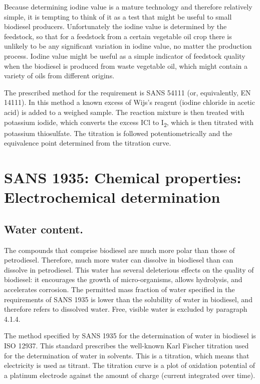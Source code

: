 Because determining iodine value is a mature technology and therefore relatively
simple, it is tempting to think of it as a test that might be useful to small
biodiesel producers. Unfortunately the iodine value is determined by the
feedstock, so that for a feedstock from a certain vegetable oil crop there is
unlikely to be any significant variation in iodine value, no matter the
production process. Iodine value might be useful as a simple indicator of
feedstock quality when the biodiesel is produced from waste vegetable oil, which
might contain a variety of oils from different origins.

The prescribed method for the requirement is SANS 54111 (or, equivalently, EN
14111). In this method a known excess of Wijs's reagent (iodine chloride in
acetic acid) is added to a weighed sample. The reaction mixture is then treated
with potassium iodide, which converts the excess ICl to I\textsubscript{2},
which is then titrated with potassium thiosulfate. The titration is followed
potentiometrically and the equivalence point determined from the titration
curve.

\section{SANS 1935: Chemical properties: Electrochemical determination}

\subsection{Water content.}

The compounds that comprise biodiesel are much more polar than those of
petro\-diesel. Therefore, much more water can dissolve in biodiesel than can
dissolve in petrodiesel. This water has several deleterious effects on the
quality of biodiesel: it encourages the growth of micro-organisms, allows
hydrolysis, and accelerates corrosion. The permitted mass fraction of water
specified in the requirements of SANS 1935 is lower than the solubility of water
in biodiesel, and therefore refers to dissolved water. Free, visible water is
excluded by paragraph 4.1.4.

The method specified by SANS 1935 for the determination of water in biodiesel is
ISO 12937. This standard prescribes the well-known Karl Fischer titration used
for the determination of water in solvents. This is a 
titration, which means that electricity is used as titrant. The titration curve
is a plot of oxidation potential of a platinum electrode against the amount of
charge (current integrated over time). 




